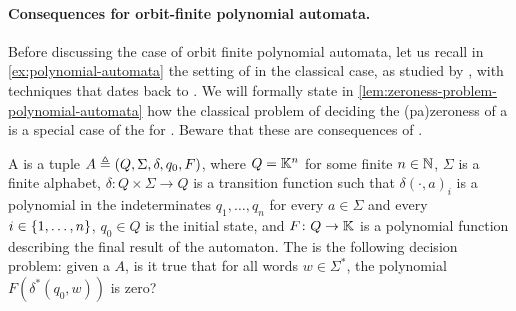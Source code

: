 \paragraph{Consequences for orbit-finite polynomial automata.} Before
discussing the case of orbit finite polynomial automata, let us recall in
\cref{ex:polynomial-automata}
the
setting of  in the classical case, as studied by
\cite{BEDUSHWO17}, with techniques that dates back to \cite{MULSEI02}. We will
formally state in \cref{lem:zeroness-problem-polynomial-automata}
how the classical problem of deciding the \kl(pa){zeroness} of a
 is a special case of the  for . Beware that
these are consequences of \cite[Section 6, Polynomial Games]{JGL10}.

\begin{definition}
  \label{ex:polynomial-automata}
  A  is a tuple $A \triangleq (Q, \Sigma, \delta, q_0, F)$,
  where $Q = \mathbb{K}^n$ for some finite $n \in \mathbb{N}$, $\Sigma$ is a finite alphabet,
  $\delta \colon Q \times \Sigma \to Q$ is a transition function such that 
  $\delta(\cdot,a)_i$ is a polynomial in the indeterminates $q_1, \dots, q_n$ for every
  $a \in \Sigma$ and every $i \in \{ 1, \dots, n \}$, $q_0 \in Q$ is the initial state,
  and $F \colon Q \to \mathbb{K}$ is a polynomial function describing the final result of the 
  automaton.
  The  is the following decision problem:
  given a  $A$, is it true that 
  for all words $w \in \Sigma^*$, the polynomial $F(\delta^*(q_0, w))$ is zero?
\end{definition}

